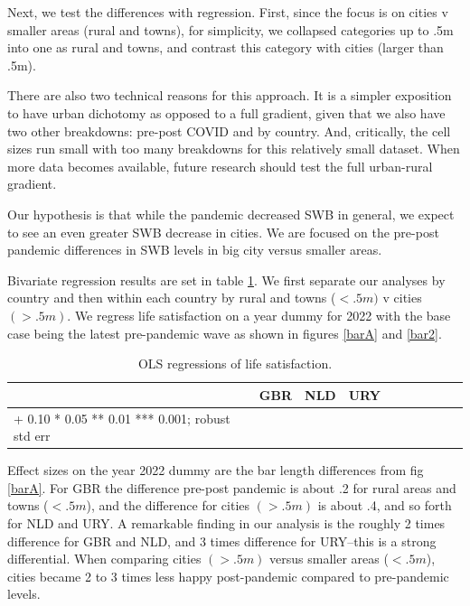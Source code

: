 \documentclass[10pt, letterpaper]{article}
\begin{document}
\begin{spacing}{1.4}
Next, we test the differences with regression. First, since the focus is on cities v smaller areas (rural and towns), for simplicity, we collapsed categories up to .5m into one as rural and towns, and contrast this category with cities (larger than .5m). 

There are also two technical reasons for this approach. It is a simpler exposition to have urban dichotomy as opposed to a full gradient, given that we also have two other
breakdowns: pre-post COVID and by country. And, critically, the cell sizes run small with too many breakdowns for this relatively small dataset. When more data becomes available, future research should test the full urban-rural gradient.  

Our hypothesis is that while the pandemic decreased SWB in general, we expect to see an even greater SWB decrease in cities. We are focused on the pre-post pandemic differences in SWB levels in big city versus smaller areas. 

Bivariate regression results are set in table \ref{a}.
We first separate our analyses by country and then within each country by rural and
towns ($<.5m)$ v cities $(>.5m)$. We regress life satisfaction on a year dummy
for 2022 with the base case being the latest pre-pandemic wave as shown in
figures \ref{barA} and \ref{bar2}. 



\begin{spacing}{.9} \begin{table}[H]\centering   \begin{scriptsize} \begin{tabular}{p{1.8in}p{.5in}p{.5in}|p{.5in}p{.5in}|p{.5in}p{.5in}|p{.5in}p{.5in}p{.5in}p{.5 in}p{.5in}p{.5 in}}\hline&\multicolumn{2}{c}{GBR}&\multicolumn{2}{c}{NLD}&\multicolumn{2}{c}{URY}\\  \hline + 0.10 * 0.05 ** 0.01 *** 0.001; robust std err \end{tabular}\end{scriptsize}\caption{\label{a}OLS regressions of life satisfaction.}\end{table} \end{spacing}

 Effect sizes on the year 2022 dummy are the bar length differences from fig \ref{barA}. For GBR the difference pre-post pandemic is about .2 for rural areas and towns ($<.5m$), and the difference for cities $(>.5m)$ is about .4, and so forth for NLD and URY.
 A remarkable finding in our analysis is the roughly 2 times difference for GBR and NLD, and 3 times difference for URY--this is a strong differential. When comparing cities $(>.5m)$ versus smaller areas ($<.5m$), cities became 2 to 3 times less happy post-pandemic compared to pre-pandemic levels.
 

\end{spacing}
\end{document}
